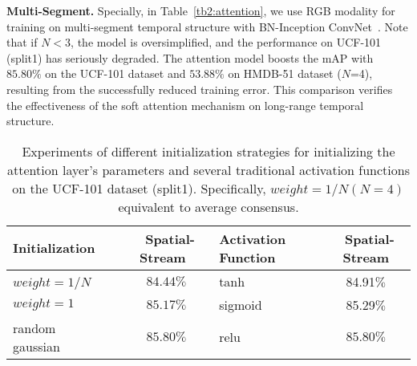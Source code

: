 \documentclass[runningheads,a4paper]{llncs}
\begin{document}
\noindent \textbf{Multi-Segment.}
Specially, in Table~\ref{tb2:attention},
we use RGB modality for training on multi-segment temporal structure with BN-Inception ConvNet~\cite{ioffe2015batch}. Note that if $N<3$, the model is oversimplified, and the performance on UCF-101 (split1) has seriously degraded. The attention model boosts the mAP with $85.80\%$ on the UCF-101 dataset and $53.88\%$ on HMDB-51 dataset ($N$=4),
resulting from the successfully reduced training error. This comparison verifies the effectiveness of the soft attention mechanism on long-range temporal structure.
\begin{table*}[t]
	\caption{Experiments of different initialization strategies for initializing the attention
		layer's parameters and several traditional activation functions on the UCF-101 dataset (split1).
		Specifically, $weight=1/N(N=4)$ equivalent to average consensus.}
	\label{tb3:initialization}
	\begin{center}
		\begin{small}
			\begin{tabular}{lc|lc}
				\toprule
				Initialization & ~Spatial-Stream~ & Activation Function~ & ~Spatial-Stream \\
				\midrule
				$weight=1/N$~~ & $ 84.44\% $ & tanh & 84.91$ \% $ \\
				$weight=1$ &  $ 85.17\% $ & sigmoid & 85.29$ \% $ \\
				random gaussian~~~~~	 & $ \mathbf{85.80}\% $ & relu~~~~~~~ & $ \mathbf{85.80}\% $ \\
				\bottomrule
			\end{tabular}
		\end{small}
	\end{center}
\end{table*}
\end{document}
